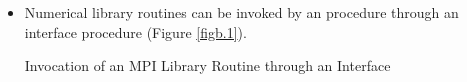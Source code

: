 \begin{itemize}

 \item Numerical library routines can be invoked by an {\XMP} procedure
       through an interface procedure (Figure \ref{figb.1}).

 \begin{myfigure}
  \caption{Invocation of an MPI Library Routine through an Interface}
  \label{figb.1}
 \end{myfigure}


\end{itemize}
